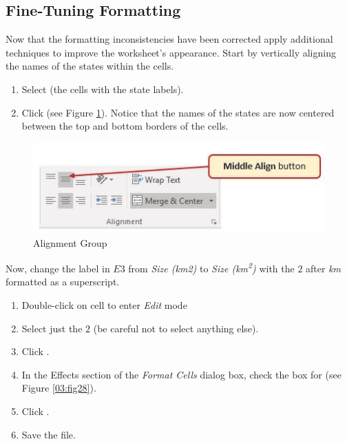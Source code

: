 \subsection{Fine-Tuning Formatting}

Now that the formatting inconsistencies have been corrected apply additional techniques to improve the worksheet's appearance. Start by vertically aligning the names of the states within the cells.

\begin{enumbox}
	\begin{enumerate}
		\item Select  (the cells with the state labels).
		\item Click  (see Figure \ref{03:fig27}). Notice that the names of the states are now centered between the top and bottom borders of the cells.
	\end{enumerate}
\end{enumbox}
	
\begin{figure}[H]
	\centering
	\includegraphics[width=\maxwidth{.95\linewidth}]{gfx/ch03_fig27}
	\caption{Alignment Group}
	\label{03:fig27}
\end{figure}

Now, change the label in $ E3 $ from \textit{Size (km2)} to \textit{Size (km\textsuperscript{2})} with the $ 2 $ after \textit{km} formatted as a superscript.

\begin{enumbox}
	\begin{enumerate}
		\item Double-click on cell  to enter \textit{Edit} mode
		\item Select just the $ 2 $ (be careful not to select anything else).
		\item Click . 	
		\item In the Effects section of the \textit{Format Cells} dialog box, check the box for  (see Figure \ref{03:fig28}). 
		\item Click .
		\item Save the  file.
	\end{enumerate}
\end{enumbox}

